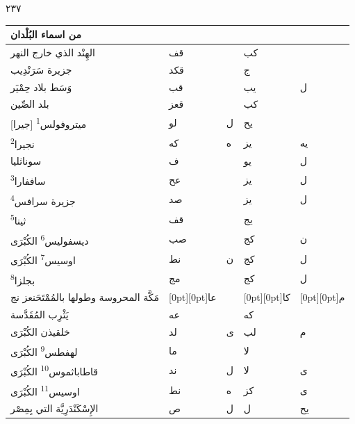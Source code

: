 \documentclass[11pt]{article}
\begin{document}
\clearpage
{\large \textarabic{٢٣٧}}\par\vspace{1mm}
\begin{Arabic}
\noindent\begin{minipage}[t]{0.495\textwidth}\setlength{\tabcolsep}{2.2pt}\begin{tabular}{|p{55mm}|>{\centering\arraybackslash}p{4.8mm}>{\centering\arraybackslash}p{4.8mm}|>{\centering\arraybackslash}p{4.8mm}>{\centering\arraybackslash}p{4.8mm}|}\hline
\centering من اسماء البُلْدان & \multicolumn{2}{c|}{الطول} & \multicolumn{2}{c|}{العرض} \\ \hline
{}الهِنْد الذي خارج النهر & قف &  & كب &  \\
{}جزيرة سَرَنْدِيب & قكد &  & ج &  \\
{}وَسَط بلاد حِمْيَر & قب &  & يب & ل \\
{}بلد الصِّين & قعز &  & كب &  \\
{}[جيرا] ميتروفولس\textsuperscript{1} & لو & ل & يح &  \\
{}نجيرا\textsuperscript{2} & كه & ه & يز & يه \\
{}سوناثليا & ف &  & يو & ل \\
{}ساففارا\textsuperscript{3} & عح &  & يز & ل \\
{}جزيرة سرافس\textsuperscript{4} & صد &  & يز & ل \\
{}ثينا\textsuperscript{5} & قف &  & يج &  \\
{}ديسفوليس\textsuperscript{6} الكُبْرَى & صب &  & كج & ن \\
{}اوسيس\textsuperscript{7} الكُبْرَى & نط & ن & كج & ل \\
{}بجلزا\textsuperscript{8} & مج &  & كج & ل \\
{}مَكَّة المحروسة وطولها بالمُمْتَحَن\newline عز نج & \raisebox{-1\normalbaselineskip}[0pt][0pt]{عا} &  & \raisebox{-1\normalbaselineskip}[0pt][0pt]{كا} & \raisebox{-1\normalbaselineskip}[0pt][0pt]{م} \\
{}يَثْرِب المُقَدَّسة & عه &  & كه &  \\
{}خلقيذن الكُبْرَى & لد & ى & لب & م \\
{}لهفطس\textsuperscript{9} الكُبْرَى & ما &  & لا &  \\
{}قاطاباثموس\textsuperscript{10} الكُبْرَى & ند & ل & لا & ى \\
{}اوسيس\textsuperscript{11} الكُبْرَى & نط & ه & كز & ى \\
{}الإِسْكَنْدَرِيَّة التي بِمِصْر & ص & ل & ل & يح \\

\end{tabular}
\end{minipage}
\end{Arabic}
\end{document}
